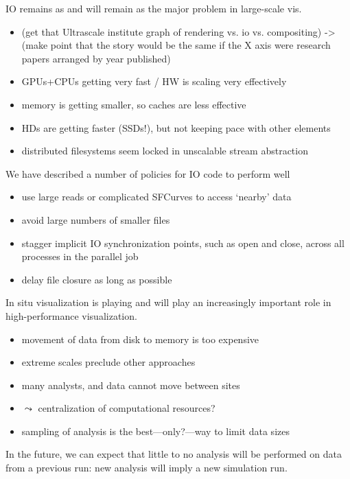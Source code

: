 



IO remains as and will remain as the major problem in large-scale vis.
\begin{itemize}
	\item (get that Ultrascale institute graph of rendering vs. io vs. compositing)
	-> (make point that the story would be the same if the X axis were research
	    papers arranged by year published)
	\item GPUs+CPUs getting very fast / HW is scaling very effectively
	\item memory is getting smaller, so caches are less effective
	\item HDs are getting faster (SSDs!), but not keeping pace with other elements
	\item distributed filesystems seem locked in unscalable stream abstraction
\end{itemize}

We have described a number of policies for IO code to perform well
\begin{itemize}
	\item use large reads or complicated SFCurves to access `nearby' data
	\item avoid large numbers of smaller files
	\item stagger implicit IO synchronization points, such as open and close,
	across all processes in the parallel job
	\item delay file closure as long as possible
\end{itemize}


In situ visualization is playing and will play an increasingly important role
in high-performance visualization.
\begin{itemize}
	\item movement of data from disk to memory is too expensive
	\item extreme scales preclude other approaches
	\item many analysts, and data cannot move between sites
	\item $\leadsto$ centralization of computational resources?
	\item sampling of analysis is the best---only?---way to limit data sizes
\end{itemize}
In the future, we can expect that little to no analysis will be
performed on data from a previous run: new analysis will imply a new
simulation run.

